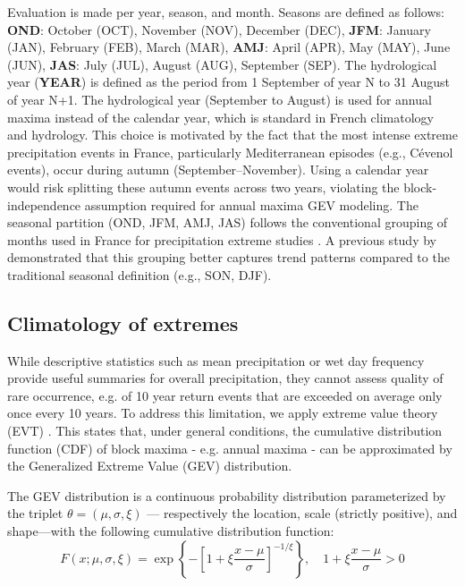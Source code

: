 \documentclass[hess, manuscript]{copernicus}
\begin{document}
Evaluation is made per year, season, and month. Seasons are defined as follows: \textbf{OND}:
October (OCT), November (NOV), December (DEC), \textbf{JFM}: January
(JAN), February (FEB), March (MAR), \textbf{AMJ}: April (APR), May
(MAY), June (JUN), \textbf{JAS}: July (JUL), August (AUG), September
(SEP). The hydrological year (\textbf{YEAR}) is defined as the period
from 1 September of year N to 31 August of year N+1. The hydrological year (September to August) is used for annual maxima instead of the calendar year, which is standard in French climatology and hydrology. This choice is motivated by the fact that the most intense extreme precipitation events in France, particularly Mediterranean episodes (e.g., Cévenol events), occur during autumn (September–November). Using a calendar year would risk splitting these autumn events across two years, violating the block-independence assumption required for annual maxima GEV modeling. The seasonal partition (OND, JFM, AMJ, JAS) follows the conventional grouping of months used in France for precipitation extreme studies \citep{haruna-etal-2026}. A previous study by \cite{berghald-etal-2025} demonstrated that this grouping better captures trend patterns compared to the traditional seasonal definition (e.g., SON, DJF). %

\subsection{Climatology of extremes}\label{climatology}

While descriptive statistics such as mean precipitation or wet day frequency provide useful summaries for overall precipitation, they cannot assess quality of rare occurrence, e.g. of 10 year return events that are exceeded on average only once every 10 years. %
To address
this limitation, we apply extreme value theory (EVT) \citep{coles2001introduction}. This states that, under general conditions, the cumulative distribution function (CDF) of block maxima - e.g. annual maxima - can be approximated by the Generalized Extreme Value (GEV)
distribution.

The GEV distribution is a continuous
probability distribution parameterized by the triplet
\(\theta = (\mu, \sigma, \xi)\) --- respectively the location, scale
(strictly positive), and shape---with the following cumulative
distribution function: \[
F(x;\mu ,\sigma ,\xi) = \exp\left\{-\left[1 + \xi\frac{x - \mu}{\sigma}\right]^{-1/\xi}\right\}, \quad 1 + \xi\frac{x - \mu}{\sigma} > 0
\]
\end{document}
